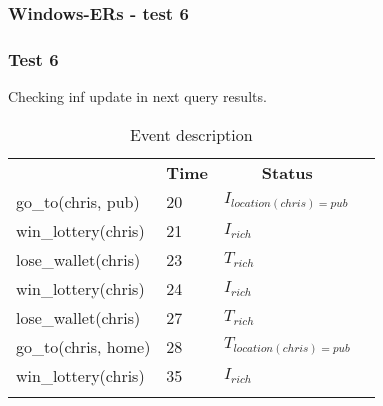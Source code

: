 \documentclass[8pt]{beamer}
\begin{document}
\begin{frame}
    \frametitle{Windows-ERs - test 6}
    \subsubsection{Test 6}
    \small
    Checking inf update in next query results. \linebreak
    \begin{minipage}{0.48\linewidth}
        \begin{table}[t!]
            \caption{Event description}
            \begin{center}

                \begin{tabular}{llll}
                    \hline\noalign{\smallskip}
                    \multicolumn{1}{l}{\textbf{Event}} & \multicolumn{1}{c}{\textbf{Time}} & \multicolumn{1}{c}{\textbf{Status}}  \\
                    go\_to(chris, pub)& 20 & $I_{location(chris)=pub}$\\
                    win\_lottery(chris)&21 &$I_{rich}$\\
                    lose\_wallet(chris)& 23 &$T_{rich}$\\
                    win\_lottery(chris)& 24 &$I_{rich}$\\
                    lose\_wallet(chris)& 27 &$T_{rich}$\\
                    go\_to(chris, home)& 28 &$T_{location(chris)=pub}$\\
                    win\_lottery(chris)& 35&$I_{rich}$\\
                    \noalign{\smallskip}
                    \hline
                \end{tabular}
            \end{center}
        \end{table}
    \end{minipage}
    \begin{minipage}{0.48\linewidth}


\end{minipage}
\end{frame}
\end{document}
